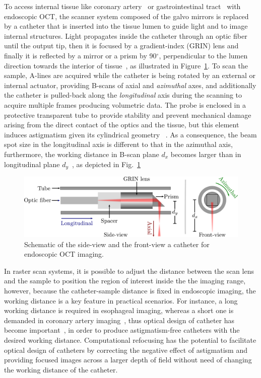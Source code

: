 To access internal tissue like coronary artery~\cite{Brezinski1996_Imaging} or gastrointestinal tract~\cite{Isenberg2003_Gastrointestinal} with endoscopic OCT, the scanner system composed of the galvo mirrors is replaced by a catheter that is inserted into the tissue lumen to guide light and to image internal structures. Light propagates inside the catheter through an optic fiber until the output tip, then it is focused by a gradient-index (GRIN) lens and finally it is reflected by a mirror or a prism by 90$^\circ$,  perpendicular to the lumen direction towards the interior of tissue~\cite{Hu2015_Optical}, as illustrated in Figure~\ref{fig:CatheterSchematic}. To scan the sample, A-lines are acquired while the catheter is being rotated by an external or internal actuator, providing B-scans of axial and \textit{azimuthal} axes, and additionally the catheter is pulled-back along the \textit{longitudinal} axis during the scanning to acquire multiple frames producing volumetric data. The probe is enclosed in a protective transparent tube to provide stability and prevent mechanical damage arising from the direct contact of the optics and the tissue, but this element induces astigmatism given its cylindrical geometry~\cite{Hu2015_Optical, Wang2012_Numerical, Xi2009_Highresolution}  . As a consequence, the beam spot size in the longitudinal axis is different to that in the azimuthal axis, furthermore, the working distance in B-scan plane $d_x$ becomes larger than in longitudinal plane $d_y$~\cite{Wang2012_Numerical}, as depicted in Fig.~\ref{fig:CatheterSchematic}

\begin{figure}[htb!]
	\centering
	\includegraphics[width=.9\textwidth]{Figures/Results/CatheterSchematic.pdf}
	\caption[Schematic of a catheter for endoscopic OCT imaging.]{Schematic of the side-view and the front-view a catheter for endoscopic OCT imaging.}
	\label{fig:CatheterSchematic}
\end{figure}

In raster scan systems, it is possible to adjust the distance between the scan lens and the sample to position the region of interest inside the the imaging range, however, because the catheter-sample distance is fixed in endoscopic imaging, the working distance is a key feature in practical scenarios. For instance, a long working distance is required in esophageal imaging, whereas a short one is demanded in coronary artery imaging~\cite{Wang2012_Numerical}, thus optical design of catheter has become important~\cite{Hu2015_Optical, Xi2009_Highresolution, Kang2010_Endoscopically}, in order to produce astigmatism-free catheters with the desired working distance. Computational refocusing has the potential to facilitate optical design of catheters by correcting the negative effect of astigmatism and providing focused images across a larger depth of field without need of changing the working distance of the catheter.

